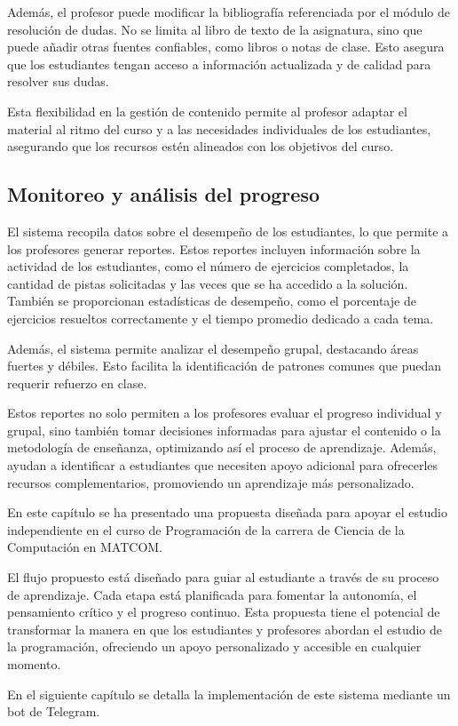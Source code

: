 Además, el profesor puede modificar la bibliografía referenciada por el módulo de resolución de dudas. No se limita al libro de texto de la asignatura, sino que puede añadir otras fuentes confiables, como libros o notas de clase. Esto asegura que los estudiantes tengan acceso a información actualizada y de calidad para resolver sus dudas.

Esta flexibilidad en la gestión de contenido permite al profesor adaptar el material al ritmo del curso y a las necesidades individuales de los estudiantes, asegurando que los recursos estén alineados con los objetivos del curso.

\subsection{Monitoreo y análisis del progreso}

El sistema recopila datos sobre el desempeño de los estudiantes, lo que permite a los profesores generar reportes. Estos reportes incluyen información sobre la actividad de los estudiantes, como el número de ejercicios completados, la cantidad de pistas solicitadas y las veces que se ha accedido a la solución. También se proporcionan estadísticas de desempeño, como el porcentaje de ejercicios resueltos correctamente y el tiempo promedio dedicado a cada tema.

Además, el sistema permite analizar el desempeño grupal, destacando áreas fuertes y débiles. Esto facilita la identificación de patrones comunes que puedan requerir refuerzo en clase. 

Estos reportes no solo permiten a los profesores evaluar el progreso individual y grupal, sino también tomar decisiones informadas para ajustar el contenido o la metodología de enseñanza, optimizando así el proceso de aprendizaje. Además, ayudan a identificar a estudiantes que necesiten apoyo adicional para ofrecerles recursos complementarios, promoviendo un aprendizaje más personalizado.

En este capítulo se ha presentado una propuesta diseñada para apoyar el estudio independiente en el curso de Programación de la carrera de Ciencia de la Computación en \mbox{MATCOM}.

El flujo propuesto está diseñado para guiar al estudiante a través de su proceso de aprendizaje. Cada etapa está planificada para fomentar la autonomía, el pensamiento crítico y el progreso continuo. Esta propuesta tiene el potencial de transformar la manera en que los estudiantes y profesores abordan el estudio de la programación, ofreciendo un apoyo personalizado y accesible en cualquier momento.

En el siguiente capítulo se detalla la implementación de este sistema mediante un bot de Telegram.